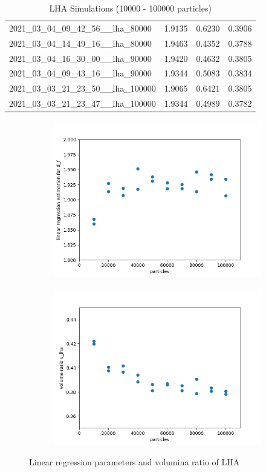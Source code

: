 \documentclass[12pt,a4paper]{scrartcl}
\numberwithin{equation}{subsection}
\newcommand{\1}{\mathbbm{1}}
\numberwithin{equation}{section}
\theoremstyle{definition}
\begin{document}
\begin{table}[t]
\begin{tabular}{llll}
		2021\_03\_04\_09\_42\_56\_\_lha\_80000  & 1.9135 & 0.6230 & 0.3906\\
		2021\_03\_04\_14\_49\_16\_\_lha\_80000  & 1.9463 & 0.4352 & 0.3788\\
		2021\_03\_04\_16\_30\_00\_\_lha\_90000  & 1.9420 & 0.4632 & 0.3805\\
		2021\_03\_04\_09\_43\_16\_\_lha\_90000  & 1.9344 & 0.5083 & 0.3834\\
		2021\_03\_03\_21\_23\_50\_\_lha\_100000 & 1.9065 & 0.6421 & 0.3805\\
		2021\_03\_03\_21\_23\_47\_\_lha\_100000 & 1.9344 & 0.4989 & 0.3782
	\end{tabular}
	\caption{LHA Simulations (10000 - 100000 particles)}
	\label{lhasimulation}
\end{table}

\begin{figure}[h]
	\centering
	\begin{subfigure}[b]{.45\textwidth}
		\includegraphics[width=1\linewidth]{images/lhaplot.png}
	\end{subfigure}
	\begin{subfigure}[b]{.45\textwidth}
		\includegraphics[width=1\linewidth]{images/volumeplot.png}
	\end{subfigure}
 \caption{Linear regression parameters and volumina ratio of LHA}
 \label{plot}
\end{figure}
\end{document}
